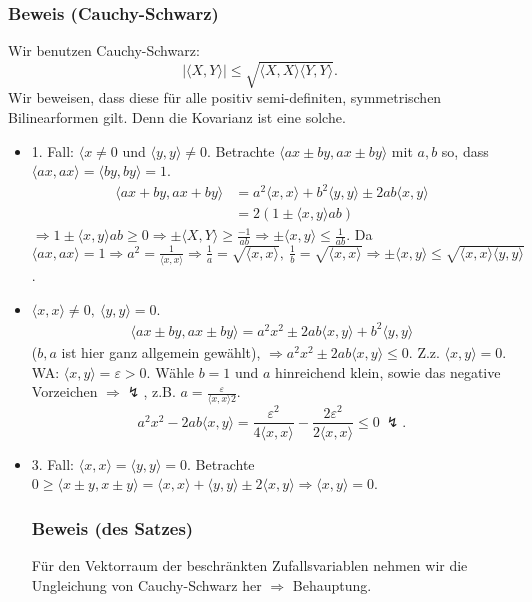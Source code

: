 \subsubsection{Beweis (Cauchy-Schwarz)}
Wir benutzen Cauchy-Schwarz:
\[
|\langle X,Y\rangle|\leq\sqrt{\langle X,X\rangle\langle Y,Y\rangle}.
\]
Wir beweisen, dass diese f\"ur alle positiv semi-definiten, symmetrischen Bilinearformen gilt. Denn die Kovarianz ist eine solche.
\begin{itemize}
\item 1. Fall: $\langle x\neq0$ und $\langle y,y\rangle\neq0$. Betrachte $\langle ax\pm by,ax\pm by\rangle$ mit $a,b$ so, dass $\langle ax,ax\rangle=\langle by,by\rangle=1$.
\begin{align*}
\langle ax+by,ax+by\rangle&=a^2\langle x,x\rangle + b^2\langle y,y\rangle\pm 2ab\langle x,y\rangle\\
&=2(1\pm\langle x,y\rangle ab)
\end{align*}
$\Rightarrow 1\pm\langle x,y\rangle ab\geq0\Rightarrow\pm\langle X,Y\rangle\geq\frac{-1}{ab}\Rightarrow\pm\langle x,y\rangle\leq\frac{1}{ab}$. Da $\langle ax,ax\rangle=1\Rightarrow a^2=\frac{1}{\langle x,x\rangle}\Rightarrow\frac{1}{a}=\sqrt{\langle x,x\rangle},\ \frac{1}{b}=\sqrt{\langle x,x\rangle}\Rightarrow\pm\langle x,y\rangle\leq\sqrt{\langle x,x\rangle\langle y,y\rangle}$.
\item $\langle x,x\rangle\neq0,\ \langle y,y\rangle=0$.
\begin{align*}
\langle ax\pm by,ax\pm by\rangle=a^2x^2\pm 2ab\langle x,y\rangle+b^2\langle y,y\rangle
\end{align*}
($b,a$ ist hier ganz allgemein gew\"ahlt), $\Rightarrow a^2x^2\pm2ab\langle x,y\rangle\leq0$. Z.z. $\langle x,y\rangle=0$. WA: $\langle x,y\rangle=\varepsilon>0$. W\"ahle $b=1$ und $a$ hinreichend klein, sowie das negative Vorzeichen $\Rightarrow\lightning$, z.B. $a=\frac{\varepsilon}{\langle x,x\rangle2}$.
\[
a^2x^2-2ab\langle x,y\rangle=\frac{\varepsilon^2}{4\langle x,x\rangle}-\frac{2\varepsilon^2}{2\langle x,x\rangle}\leq0\ \lightning.
\]
\item 3. Fall: $\langle x,x\rangle=\langle y,y\rangle=0$. Betrachte $0\geq\langle x\pm y,x\pm y\rangle=\langle x,x\rangle+\langle y,y\rangle\pm2\langle x,y\rangle\Rightarrow\langle x,y\rangle=0$.
\subsubsection{Beweis (des Satzes)}
F\"ur den Vektorraum der beschr\"ankten Zufallsvariablen nehmen wir die Ungleichung von Cauchy-Schwarz her $\Rightarrow$ Behauptung.
\end{itemize}
